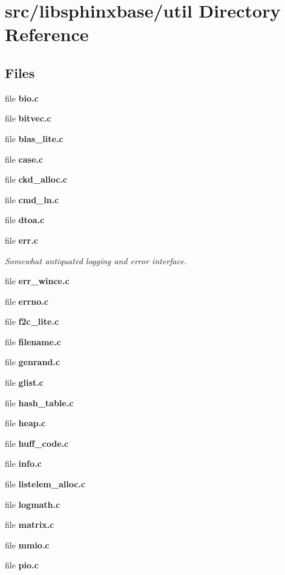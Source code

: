 \section{src/libsphinxbase/util Directory Reference}
\label{dir_dc1f04dceb148346198172cb52290701}
\subsection*{Files}
\begin{DoxyCompactItemize}
\item 
file {\bfseries bio.\-c}
\item 
file {\bfseries bitvec.\-c}
\item 
file {\bfseries blas\-\_\-lite.\-c}
\item 
file {\bfseries case.\-c}
\item 
file {\bfseries ckd\-\_\-alloc.\-c}
\item 
file {\bfseries cmd\-\_\-ln.\-c}
\item 
file {\bfseries dtoa.\-c}
\item 
file {\bf err.\-c}
\begin{DoxyCompactList}\small\item\em Somewhat antiquated logging and error interface. \end{DoxyCompactList}\item 
file {\bfseries err\-\_\-wince.\-c}
\item 
file {\bfseries errno.\-c}
\item 
file {\bfseries f2c\-\_\-lite.\-c}
\item 
file {\bfseries filename.\-c}
\item 
file {\bfseries genrand.\-c}
\item 
file {\bfseries glist.\-c}
\item 
file {\bfseries hash\-\_\-table.\-c}
\item 
file {\bfseries heap.\-c}
\item 
file {\bfseries huff\-\_\-code.\-c}
\item 
file {\bfseries info.\-c}
\item 
file {\bfseries listelem\-\_\-alloc.\-c}
\item 
file {\bfseries logmath.\-c}
\item 
file {\bfseries matrix.\-c}
\item 
file {\bfseries mmio.\-c}
\item 
file {\bfseries pio.\-c}
\item 

\end{DoxyCompactItemize}

